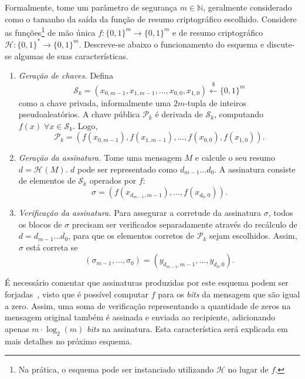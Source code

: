 \documentclass{ufsctex/ufsctex}
\newcommand{\hh}{\mathcal{H}}
\newcommand{\pk}{\mathcal{P}_k}
\newcommand{\sk}{\mathcal{S}_k}
\newcommand{\hash}[2][]{\mathcal{H}^{#1} (#2)}
\newcommand{\binwds}[1]{\{0, 1\}^{#1}}
\newcommand{\fhash}[1]{\hh{}: \binwds{*} \longrightarrow{} \binwds{#1}}
\newcommand{\random}{\stackrel{\$}{\longleftarrow}}
\begin{document}
Formalmente, tome um parâmetro de segurança $m \in \mathbb{N}$, geralmente
considerado como o tamanho da saída da função de resumo criptográfico
escolhido. Considere as funções\footnote{Na prática, o esquema pode ser
instanciado utilizando $\hh{}$ no lugar de $f$.} de mão única $f : \binwds{m}
\longrightarrow \binwds{m}$ e de resumo criptográfico $\fhash{m}$.  Descreve-se
abaixo o funcionamento do esquema e discute-se algumas de suas características.

\begin{enumerate}

  \item[] \emph{Geração de chaves.} Defina
      \begin{equation}
        \sk{} = (x_{0, m-1}, x_{1, m-1}, \dots, x_{0,0}, x_{1,0})
          \random{} \binwds{m}
      \end{equation}
        como a chave privada, informalmente uma $2m$-tupla de inteiros
        pseudoaleatórios. A chave pública $\pk{}$ é derivada de $\sk{}$,
        computando $f(x) \; \forall x \in  \sk{}$. Logo,
        \begin{equation}
          \pk{} = (f(x_{0, m-1}), f(x_{1, m-1}), \dots, f(x_{0,0}), f(x_{1,0})).
        \end{equation}

  \item[] \emph{Geração da assinatura.} Tome uma mensagem $M$ e calcule o seu
      resumo $d = \hash{M}$. $d$ pode ser representado como $d_{m-1} \dots
        d_0$. A assinatura consiste de elementos de $\sk{}$ operados por $f$:
        \begin{equation}
          \sigma = (f(x_{d_{m-1}, m-1}), \dots, f(x_{d_0, 0})).
        \end{equation}

  \item[] \emph{Verificação da assinatura.} Para assegurar a corretude da
      assinatura $\sigma$, todos os blocos de $\sigma$ precisam ser verificados
        separadamente através do recálculo de $d = d_{m-1} \dots d_0$, para que
        os elementos corretos de $\pk{}$ sejam escolhidos.  Assim, $\sigma$
        está correta se
        \begin{equation}
          (\sigma_{m-1}, \dots, \sigma_0)
            = (y_{d_{m-1}, m-1}, \dots, y_{d_{0}, 0}).
        \end{equation}

\end{enumerate}

É necessário comentar que assinaturas produzidas por este esquema podem ser
forjadas~\cite{Merkle:1989:CDS:118209.118230}, visto que é possível computar
$f$ para os \emph{bits} da mensagem que são igual a zero. Assim, uma soma de
verificação representando a quantidade de zeros na mensagem original também é
assinada e enviada ao recipiente, adicionando apenas $m \cdot \log_2(m)$
\emph{bits} na assinatura. Esta característica será explicada em mais detalhes
no próximo esquema.
\end{document}
